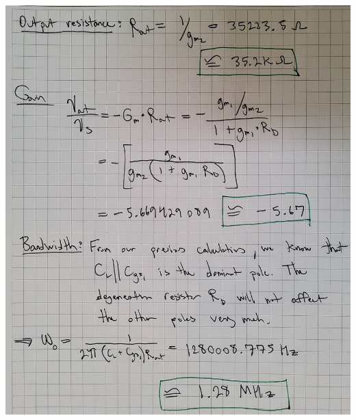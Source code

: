 \documentclass[12pt, fleqn]{article}
\begin{document}
\newpage
\includegraphics[scale=0.165, angle=90, center]{p1_10.jpg}\\
\newpage
\end{document}
